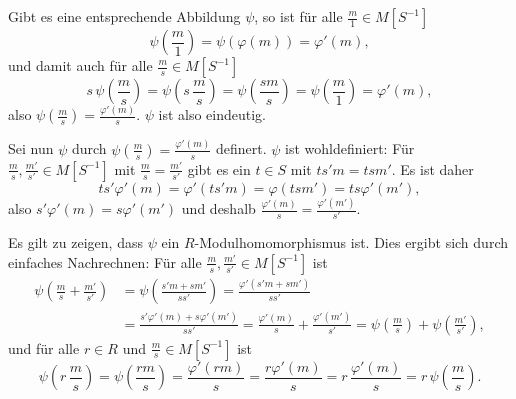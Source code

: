 \documentclass[a4paper,10pt]{article}
\theoremstyle{definition}
\begin{document}
Gibt es eine entsprechende Abbildung $\psi$, so ist für alle $\frac{m}{1} \in M[S^{-1}]$
\[
 \psi\left(\frac{m}{1}\right)
 = \psi(\varphi(m))
 = \varphi'(m),
\]
und damit auch für alle $\frac{m}{s} \in M[S^{-1}]$
\[
 s \, \psi\left( \frac{m}{s} \right)
 = \psi\left( s \, \frac{m}{s} \right)
 = \psi\left( \frac{sm}{s} \right)
 = \psi\left( \frac{m}{1} \right)
 = \varphi'(m),
\]
also $\psi\left(\frac{m}{s}\right) = \frac{\varphi'(m)}{s}$. $\psi$ ist also eindeutig.

Sei nun $\psi$ durch $\psi\left(\frac{m}{s}\right) = \frac{\varphi'(m)}{s}$ definert. $\psi$ ist wohldefiniert: Für $\frac{m}{s}, \frac{m'}{s'} \in M[S^{-1}]$ mit $\frac{m}{s} = \frac{m'}{s'}$ gibt es ein $t \in S$ mit $ts'm = tsm'$. Es ist daher
\[
 t s' \varphi'(m) = \varphi'(t s' m) = \varphi(tsm') = ts \varphi'(m'),
\]
also $s' \varphi'(m) = s \varphi'(m')$ und deshalb $\frac{\varphi'(m)}{s} = \frac{\varphi'(m')}{s'}$.

Es gilt zu zeigen, dass $\psi$ ein $R$-Modulhomomorphismus ist. Dies ergibt sich durch einfaches Nachrechnen: Für alle $\frac{m}{s}, \frac{m'}{s'} \in M[S^{-1}]$ ist
\begin{align*}
 \psi\left( \frac{m}{s} + \frac{m'}{s'} \right)
 &= \psi\left( \frac{s'm + sm'}{ss'} \right)
 = \frac{ \varphi'(s'm + sm') }{ss'} \\
 &= \frac{ s'\varphi'(m) + s\varphi'(m') }{ss'}
 = \frac{\varphi'(m)}{s} + \frac{\varphi'(m')}{s'}
 = \psi\left(\frac{m}{s}\right) + \psi\left(\frac{m'}{s'}\right),
\end{align*}
und für alle $r \in R$ und $\frac{m}{s} \in M[S^{-1}]$ ist
\[
 \psi\left(r \, \frac{m}{s}\right)
 = \psi\left(\frac{rm}{s}\right)
 = \frac{\varphi'(rm)}{s}
 = \frac{r\varphi'(m)}{s}
 = r \, \frac{\varphi'(m)}{s}
 = r \, \psi\left(\frac{m}{s}\right).
\]
\end{document}
